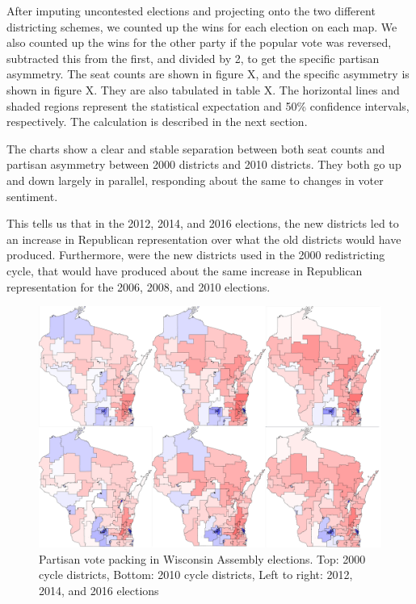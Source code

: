 \documentclass[preprint,12pt]{article}
\begin{document}
After imputing uncontested elections and projecting onto the two different districting schemes, we counted up the wins for each election on each map.
We also counted up the wins for the other party if the popular vote was reversed, subtracted this from the first, and divided by 2, to get the specific partisan asymmetry.
The seat counts are shown in figure X, and the specific asymmetry is shown in figure X.  They are also tabulated in table X.
The horizontal lines and shaded regions represent the statistical expectation and 50\% confidence intervals, respectively.
The calculation is described in the next section.

The charts show a clear and stable separation between both seat counts and partisan asymmetry between 2000 districts and 2010 districts.
They both go up and down largely in parallel, responding about the same to changes in voter sentiment.

This tells us that in the 2012, 2014, and 2016 elections, the new districts led to an increase in Republican representation over what the old districts would have produced.
Furthermore, were the new districts used in the 2000 redistricting cycle, that would have produced about the same increase in Republican representation for the 2006, 2008, and 2010 elections.

\begin{figure}[htb!]
    \begin{center}
        \includegraphics[scale=0.25]{../Figures/WI_compared/3x2.png}
        \caption{Partisan vote packing in Wisconsin Assembly elections. Top: 2000 cycle districts, Bottom: 2010 cycle districts, Left to right: 2012, 2014, and 2016 elections}\label{fig:DistrictMaps}
    \end{center}
\end{figure}
\end{document}
